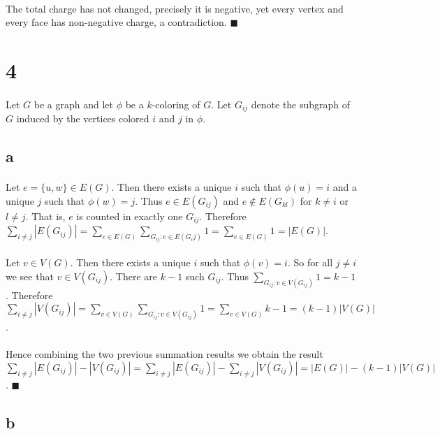 \documentclass[letterpaper,12pt,oneside,onecolumn]{report}
\begin{document}
\paragraph{}
The total charge has not changed, precisely it is negative, yet every vertex and every face has non-negative charge, a contradiction. $\blacksquare$
\section*{4}
\paragraph{}
Let $G$ be a graph and let $\phi$ be a $k$-coloring of $G$. Let $G_{ij}$ denote the subgraph of $G$ induced by the vertices colored $i$ and $j$ in $\phi$.
\subsection*{a}
\paragraph{}
Let $e = \{u,w\} \in E(G)$. Then there exists a unique $i$ such that $\phi(u) = i$ and a unique $j$ such that $\phi(w) = j$. Thus $e \in E(G_{ij})$ and $e \not\in E(G_{kl})$ for $k \neq i$ or $l \neq j$. That is, $e$ is counted in exactly one $G_{ij}$. Therefore $\sum_{i \neq j} |E(G_{ij})| = \sum_{e \in E(G)} \sum_{G_{ij}: e \in E(G_ij)} 1 = \sum_{e \in E(G)} 1 = |E(G)|$.
\paragraph{}
Let $v \in V(G)$. Then there exists a unique $i$ such that $\phi(v) = i$. So for all $j\neq i$ we see that $v \in V(G_{ij})$. There are $k-1$ such $G_{ij}$. Thus $\sum_{G_{ij}: v \in V(G_{ij})} 1 = k-1$. Therefore $\sum_{i\neq j} |V(G_{ij})| = \sum_{v \in V(G)} \sum_{G_{ij} : v \in V(G_{ij})} 1 = \sum_{v \in V(G)} k-1 = (k-1)|V(G)|$.
\paragraph{}
Hence combining the two previous summation results we obtain the result $\sum_{i\neq j}|E(G_{ij})| - |V(G_{ij})| = \sum_{i\neq j} |E(G_{ij})| - \sum_{i\neq j} |V(G_{ij})| = |E(G)| - (k-1)|V(G)|$. $\blacksquare$
\subsection*{b}
\end{document}
